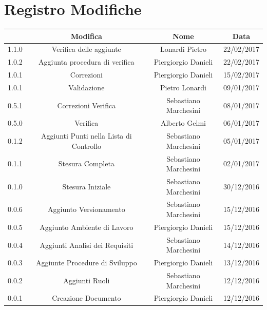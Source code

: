 \documentclass[12pt,a4paper,titlepage]{article}
\begin{document}
	
	
	\clearpage %
	
\chead{}
\cfoot{}
\rfoot{\thepage}
\renewcommand{\headrulewidth}{0.2pt}
\renewcommand{\footrulewidth}{0.2pt}
\section{Registro Modifiche}
\small %
{\renewcommand\arraystretch{1.2}  %
	\begin{tabular}{|l|c|c|c|}
			\hline
			{{\textbf{Ver.}}&{\textbf{Modifica}}&{\textbf{Nome}}&{\textbf{Data}}\\
			\hline
			1.1.0 & Verifica delle aggiunte & Lonardi Pietro & 22/02/2017 \\
			\hline
			1.0.2 & Aggiunta procedura di verifica & Piergiorgio Danieli & 22/02/2017 \\
			\hline
			1.0.1 & Correzioni & Piergiorgio Danieli & 15/02/2017 \\
			\hline
			1.0.1 & Validazione & Pietro Lonardi & 09/01/2017 \\
			\hline
			0.5.1 & Correzioni Verifica & Sebastiano Marchesini & 08/01/2017 \\
			\hline
			0.5.0 & Verifica & Alberto Gelmi & 06/01/2017 \\
			\hline
			0.1.2 & Aggiunti Punti nella Lista di Controllo & Sebastiano Marchesini & 05/01/2017 \\
			\hline
			0.1.1 & Stesura Completa & Sebastiano Marchesini & 02/01/2017 \\
			\hline
			0.1.0 & Stesura Iniziale & Sebastiano Marchesini & 30/12/2016 \\
			\hline
			0.0.6 & Aggiunto Versionamento & Sebastiano Marchesini & 15/12/2016 \\
			\hline
			0.0.5 & Aggiunto Ambiente di Lavoro & Piergiorgio Danieli & 15/12/2016 \\
			\hline
			0.0.4 & Aggiunti Analisi dei Requisiti & Sebastiano Marchesini & 14/12/2016 \\
			\hline
			0.0.3 & Aggiunte Procedure di Sviluppo & Piergiorgio Danieli & 13/12/2016 \\
			\hline
			0.0.2 & Aggiunti Ruoli & Sebastiano Marchesini & 12/12/2016 \\
			\hline
			0.0.1 & Creazione Documento & Piergiorgio Danieli & 12/12/2016 \\
			\hline
	\end{tabular}
}
\normalsize	%
\newpage
\tableofcontents
\thispagestyle{empty}
\newpage
{}
\end{document}
